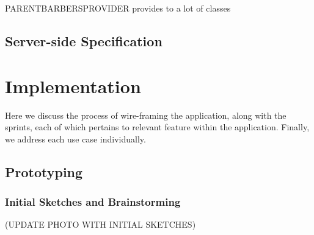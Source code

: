 \documentclass[12pt]{article}
\begin{document}
	PARENTBARBERSPROVIDER provides to a lot of classes

	
	\subsection{Server-side Specification}
	
	
	\section{Implementation}
		\label{chap:implementation}
	Here we discuss the process of wire-framing the application, along with the sprints, each of which pertains to relevant feature within the application. Finally, we address each use case individually.
	
	\subsection{Prototyping}
	\subsubsection{Initial Sketches and Brainstorming}
	(UPDATE PHOTO WITH INITIAL SKETCHES)
	
\end{document}
